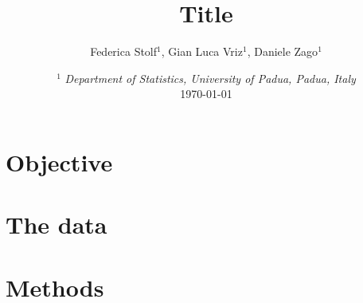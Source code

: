 \documentclass{article}
\author{Federica Stolf$ ^{1}$, Gian Luca Vriz$ ^{1}$, Daniele Zago$^1$}
\title{Title}
\date{%
\smaller
$^1$ \textit{Department of Statistics, University of Padua, Padua, Italy}\\%
\today}
\begin{document}
\maketitle

\section{Objective}

\section{The data}

\section{Methods}

\printbibliography
\end{document}
